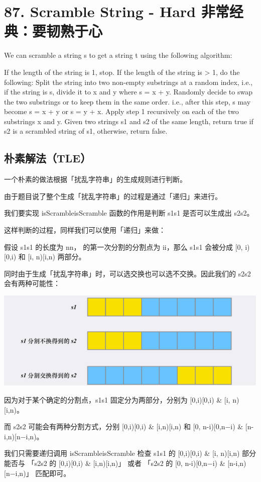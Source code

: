 \documentclass[9pt, b5paaper]{book}
\begin{document}
\section{87. Scramble String - Hard 非常经典：要韧熟于心}
\label{sec-15-2}
We can scramble a string s to get a string t using the following algorithm:

If the length of the string is 1, stop.
If the length of the string is > 1, do the following:
Split the string into two non-empty substrings at a random index, i.e., if the string is s, divide it to x and y where s = x + y.
Randomly decide to swap the two substrings or to keep them in the same order. i.e., after this step, s may become s = x + y or s = y + x.
Apply step 1 recursively on each of the two substrings x and y.
Given two strings s1 and s2 of the same length, return true if s2 is a scrambled string of s1, otherwise, return false.
\subsection{朴素解法（TLE）}
\label{sec-15-2-1}
一个朴素的做法根据「扰乱字符串」的生成规则进行判断。

由于题目说了整个生成「扰乱字符串」的过程是通过「递归」来进行。

我们要实现 isScrambleisScramble 函数的作用是判断 s1s1 是否可以生成出 s2s2。

这样判断的过程，同样我们可以使用「递归」来做：

假设 s1s1 的长度为 nn， 的第一次分割的分割点为 ii，那么 s1s1 会被分成 [0, i)[0,i) 和 [i, n)[i,n) 两部分。

同时由于生成「扰乱字符串」时，可以选交换也可以选不交换。因此我们的 s2s2 会有两种可能性：

\includegraphics[width=.9\linewidth]{./pic/isScramble.png}


因为对于某个确定的分割点，s1s1 固定分为两部分，分别为 [0,i)[0,i) \& [i, n)[i,n)。

而 s2s2 可能会有两种分割方式，分别 [0,i)[0,i) \& [i,n)[i,n) 和 [0, n-i)[0,n−i) \& [n-i,n)[n−i,n)。

我们只需要递归调用 isScrambleisScramble 检查 s1s1 的 [0,i)[0,i) \& [i, n)[i,n) 部分能否与 「s2s2 的 [0,i)[0,i) \& [i,n)[i,n)」 或者 「s2s2 的 [0, n-i)[0,n−i) \& [n-i,n)[n−i,n)」 匹配即可。
\end{document}
